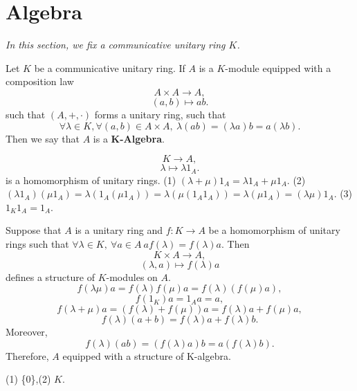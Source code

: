 \section{Algebra}
\textit{In this section, we fix a communicative unitary ring $K$.}
\begin{definitionenv}
    Let $K$ be a communicative unitary ring. If $A$ is a $K$-module equipped with a  composition law 
        $$A\times A\longrightarrow A,$$
    $$(a,b)\longmapsto a b.$$
    such that $(A,+,\cdot)$ forms a unitary ring, such that
     $$\forall \lambda\in K,\forall (a,b)\in A\times A, \ \lambda\left(ab\right)=\left(\lambda a\right)b=a\left(\lambda b\right).$$
     Then we say that $A$ is a \textbf{K-Algebra}.
\end{definitionenv}
\begin{remark}
    $$K\longrightarrow A,$$
    $$\lambda\longmapsto \lambda 1_A.$$
    is a homomorphism of unitary rings.
    \newline
    (1) $(\lambda+\mu)1_A=\lambda1_A+\mu1_A$.
    \newline
    (2) $\left(\lambda1_A\right)\left(\mu 1_A\right)=\lambda\left(1_A(\mu1_A)\right)=\lambda\left(\mu(1_A1_A)\right)=\lambda(\mu1_A)=(\lambda\mu)1_A$.
    \newline
    (3) $1_K1_A=1_A$.
\end{remark}
\begin{remark}
    Suppose that $A$ is a unitary ring and $f:K\longrightarrow A$ be a homomorphism of unitary rings such that  $\forall \lambda \in K,\ \forall a\in A \ af(\lambda)=f(\lambda)a.$ Then 
    $$K\times A\longrightarrow A,$$
    $$(\lambda,a)\longmapsto f(\lambda) a$$
    defines a structure of $K$-modules on $A$.
    $$f(\lambda\mu)a=f(\lambda)f(\mu)a=f(\lambda)\left(f(\mu)a\right),$$
    $$f(1_K)a=1_Aa=a,$$
    $$f(\lambda+\mu)a=\left(f(\lambda)+f(\mu)\right)a=f(\lambda )a+f(\mu)a,$$
    $$f(\lambda)(a+b)=f(\lambda)a+f(\lambda)b.$$
    Moreover, $$f(\lambda)(ab)=\left(f(\lambda)a\right)b=a\left(f(\lambda)b\right).$$
    Therefore, $A$ equipped with a structure of K-algebra.
\end{remark}
\begin{exampleenv}
    (1) \{0\},\quad (2) $K$.
\end{exampleenv}
